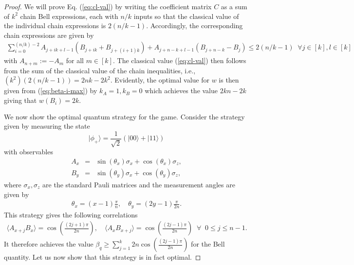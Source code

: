 \documentclass[pra,twocolumn,showpacs,preprintnumbers,amsmath,amssymb,superscriptaddress]{revtex4-1}
\begin{document}
\begin{appendix}
\begin{proof}
We will prove Eq. (\ref{eq:cl-val}) by writing the coefficient matrix $C$ as a sum of $k^2$ chain Bell expressions, each with $n/k$ inputs so that the classical value of the individual chain expressions is $2(n/k - 1)$. 
Accordingly, the corresponding chain expressions are given by
\begin{eqnarray}
\sum_{i=0}^{(n/k)-2} A_{j+i k + l-1} \left(B_{j+ik} + B_{j+(i+1)k}\right) + A_{j+n-k+l-1}\left(B_{j+n-k} - B_j \right) \leq 2(n/k-1)  \; \; \forall j \in [k], l \in [k]
\end{eqnarray}
with $A_{n+m} := - A_m$ for all $m \in [k]$. The classical value (\ref{eq:cl-val}) then follows from the sum of the classical value of the chain inequalities, i.e., $(k^2)(2(n/k - 1)) = 2nk-2k^2$. 
Evidently, the optimal value for $w$ is then given from (\ref{eq:beta-i-max}) by $k_A = 1, k_B = 0$ which achieves the value $2kn - 2k$ giving that $w(B_i) = 2k$. 

We now show the optimal quantum strategy for the game. Consider the strategy given by measuring the state
\begin{equation}
| \phi_{+} \rangle = \frac{1}{\sqrt{2}}  \left(|00 \rangle + |11 \rangle \right)
\end{equation}
with observables  
\begin{eqnarray}
A_x &=& \sin{(\theta_x)} \sigma_x + \cos{(\theta_x)} \sigma_z, \nonumber \\
B_y &=& \sin{(\theta_y)} \sigma_x + \cos{(\theta_y)} \sigma_z, 
\end{eqnarray}
where $\sigma_x, \sigma_z$ are the standard Pauli matrices and the measurement angles are given by
\begin{eqnarray}
\theta_x = (x-1) \frac{\pi}{n}, \quad  \theta_y  = (2y-1) \frac{\pi}{2n}.
\end{eqnarray}
This strategy gives the following correlations
\begin{eqnarray}
 \langle A_{x+j} B_{x} \rangle = \cos{\left(\frac{(2j+1)\pi}{2n}\right)}, \quad \langle A_{x} B_{x+j} \rangle = \cos{\left( \frac{(2j-1)\pi}{2n}\right)} \; \; \forall \;\; 0 \leq j \leq n-1.
\end{eqnarray} 
It therefore achieves the value $\beta_q \geq  \sum_{j=1}^{k} 2 n \cos{\left(\frac{(2j-1) \pi}{2n} \right)}$ for the Bell quantity. Let us now show that this strategy is in fact optimal. 





\end{proof}
\end{appendix}
\end{document}
